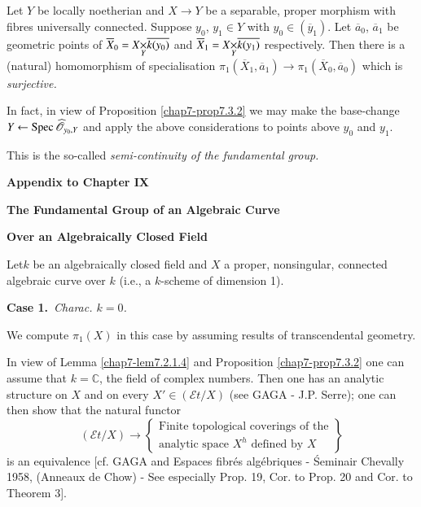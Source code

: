 \section{}\label{chap9-sec9.3}
Let $Y$ be locally noetherian and $X\to Y$ be a separable, proper
morphism with fibres universally connected. Suppose $y_{0}$, $y_{1}\in
Y$ with $y_{0}\in (\overline{y}_{1})$. Let $\overline{a}_{0}$,
$\overline{a}_{1}$ be geometric points of
$\overline{X}_{0}=\fprod{X}{\overline{k(y_{0})}}{Y}$ and
  $\overline{X}_{1}=\fprod{X}{\overline{k(y_{1})}}{Y}$
  respectively. Then there is a (natural) homomorphism of
  specialisation $\pi_{1}(\overline{X}_{1},\overline{a}_{1})\to
  \pi_{1}(\overline{X}_{0},\overline{a}_{0})$ which is {\em
    surjective.}

In fact, in view of Proposition \ref{chap7-prop7.3.2} we may make the
base-change $Y\leftarrow \operatorname{Spec} \widehat{\mathscr{O}}_{y_{0},Y}$ and apply the
above considerations to points above $y_{0}$ and $y_{1}$.

This is the so-called {\em semi-continuity of the fundamental group.}

\vfill\eject

\medskip


\begin{center}
{\Large\bf Appendix to Chapter IX}
\bigskip

{\LARGE\bf The Fundamental Group of an Algebraic Curve}
\medskip

{\LARGE\bf Over an Algebraically Closed Field}
\end{center}

Let\pageoriginale $k$ be an algebraically closed field and $X$ a
proper, nonsingular, connected algebraic curve over $k$ (i.e., a
$k$-scheme of dimension 1).

\medskip
\noindent
{\bf Case 1.}~{\em Charac. $k=0$.}
\smallskip

We compute $\pi_{1}(X)$ in this case by assuming results of
transcendental geometry.

In view of Lemma \ref{chap7-lem7.2.1.4} and
Proposition \ref{chap7-prop7.3.2} one 
can assume that $k=\mathbb{C}$, the field of complex numbers. Then one
has an analytic structure on $X$ and on every $X'\in (\mathscr{E}t/X)$
(see GAGA - J.P. Serre); one can then show that the natural functor
$$
(\mathscr{E}t/X)\to \left\{
\begin{array}{l}
\text{Finite topological coverings of the}\\
\text{analytic space $X^{h}$ defined by $X$}
\end{array}
\right\}
$$
is an equivalence [cf. GAGA and Espaces fibr\'es alg\'ebriques -
\'Seminair Chevally 1958, (Anneaux de Chow) - See especially Prop. 19,
Cor. to Prop. 20 and Cor. to Theorem  3].

